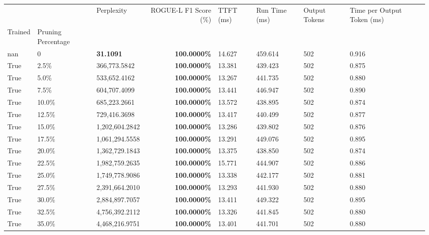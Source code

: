 \begin{table}[H]
\label{tab:evaluation-pipeline-11-trained}
\begin{tabular}{lllrllll}
\toprule
 &  & Perplexity & ROGUE-L F1 Score (\%) & TTFT (ms) & Run Time (ms) & Output Tokens & Time per Output Token (ms) \\
Trained & Pruning Percentage &  &  &  &  &  &  \\
\midrule
nan & 0 & \bfseries 31.1091 & \bfseries 100.0000\% & 14.627 & 459.614 & 502 & 0.916 \\
\cline{1-8}
True & 2.5\% & 366,773.5842 & \bfseries \color{red} 100.0000\% & 13.381 & 439.423 & 502 & 0.875 \\
\cline{1-8}
True & 5.0\% & 533,652.4162 & \bfseries \color{red} 100.0000\% & 13.267 & 441.735 & 502 & 0.880 \\
\cline{1-8}
True & 7.5\% & 604,707.4099 & \bfseries \color{red} 100.0000\% & 13.441 & 446.947 & 502 & 0.890 \\
\cline{1-8}
True & 10.0\% & 685,223.2661 & \bfseries \color{red} 100.0000\% & 13.572 & 438.895 & 502 & 0.874 \\
\cline{1-8}
True & 12.5\% & 729,416.3698 & \bfseries \color{red} 100.0000\% & 13.417 & 440.499 & 502 & 0.877 \\
\cline{1-8}
True & 15.0\% & 1,202,604.2842 & \bfseries \color{red} 100.0000\% & 13.286 & 439.802 & 502 & 0.876 \\
\cline{1-8}
True & 17.5\% & 1,061,294.5558 & \bfseries \color{red} 100.0000\% & 13.291 & 449.076 & 502 & 0.895 \\
\cline{1-8}
True & 20.0\% & 1,362,729.1843 & \bfseries \color{red} 100.0000\% & 13.375 & 438.850 & 502 & 0.874 \\
\cline{1-8}
True & 22.5\% & 1,982,759.2635 & \bfseries \color{red} 100.0000\% & 15.771 & 444.907 & 502 & 0.886 \\
\cline{1-8}
True & 25.0\% & 1,749,778.9086 & \bfseries \color{red} 100.0000\% & 13.338 & 442.177 & 502 & 0.881 \\
\cline{1-8}
True & 27.5\% & 2,391,664.2010 & \bfseries \color{red} 100.0000\% & 13.293 & 441.930 & 502 & 0.880 \\
\cline{1-8}
True & 30.0\% & 2,884,897.7057 & \bfseries \color{red} 100.0000\% & 13.411 & 449.322 & 502 & 0.895 \\
\cline{1-8}
True & 32.5\% & 4,756,392.2112 & \bfseries \color{red} 100.0000\% & 13.326 & 441.845 & 502 & 0.880 \\
\cline{1-8}
True & 35.0\% & 4,468,216.9751 & \bfseries \color{red} 100.0000\% & 13.401 & 441.701 & 502 & 0.880 \\

\end{tabular}
\end{table}
